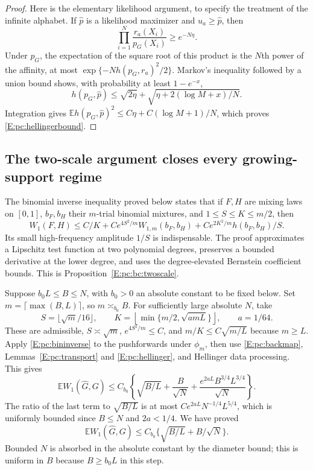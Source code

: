 \documentclass[11pt,a4paper]{article}
\theoremstyle{definition}
\theoremstyle{remark}
\numberwithin{equation}{section}
\begin{document}
\begin{proof}
Here is the elementary likelihood argument, to specify the treatment
of the infinite alphabet.  If $\widehat p$ is a likelihood maximizer
and $u_a\ge\widehat p$, then
\[
 \prod_{i=1}^N\frac{r_a(X_i)}{p_G(X_i)}\ge e^{-N\eta}.
\]
Under $p_G$, the expectation of the square root of this product is
the $N$th power of the affinity, at most
$\exp\{-Nh(p_G,r_a)^2/2\}$.  Markov's inequality followed by a
union bound shows, with probability at least $1-e^{-x}$,
\[
 h(p_G,\widehat p)\le\sqrt{2\eta}
       +\sqrt{\eta+2(\log M+x)/N}.
\]
Integration gives
$\mathbb E h(p_G,\widehat p)^2\le C\eta+C(\log M+1)/N$,
which proves \eqref{E:pc:hellingerbound}.
\end{proof}

\subsection{The two-scale argument closes every growing-support regime}

The binomial inverse inequality proved below states that if $F,H$ are
mixing laws on $[0,1]$, $b_F,b_H$ their $m$-trial binomial mixtures,
and $1\le S\le K\le m/2$, then
\begin{equation}\label{E:pc:bininverse}
 W_1(F,H)\le C/K+Ce^{4S^2/m}W_{1,m}(b_F,b_H)
                      +Ce^{2K^2/m}h(b_F,b_H)/S.
\end{equation}
Its small high-frequency amplitude $1/S$ is indispensable.
The proof approximates a Lipschitz test function at two polynomial
degrees, preserves a bounded derivative at the lower degree, and
uses the degree-elevated Bernstein coefficient bounds.  This is
Proposition~\ref{E:pc:bc:twoscale}.

Suppose $b_0L\le B\le N$, with $b_0>0$ an absolute constant to
be fixed below.  Set $m=\lceil\max(B,L)\rceil$, so $m\asymp_{b_0}B$.
For sufficiently large absolute $N$, take
\[
 S=\lfloor\sqrt m/16\rfloor,\qquad
 K=\left\lfloor\min\{m/2,\sqrt{a mL}\}\right\rfloor,
 \qquad a=1/64.
\]
These are admissible, $S\asymp\sqrt m$, $e^{4S^2/m}\le C$, and
$m/K\le C\sqrt{m/L}$ because $m\ge L$.
Apply \eqref{E:pc:bininverse} to the pushforwards under $\phi_m$,
then use \eqref{E:pc:backmap}, Lemmas~\ref{E:pc:transport} and
\ref{E:pc:hellinger}, and Hellinger data processing.  This gives
\[
 \mathbb E W_1(\widehat G,G)
 \le C_{b_0}\left\{
 \sqrt{B/L}+\frac B{\sqrt N}
       +\frac{e^{2aL}B^{3/4}L^{3/4}}{\sqrt N}\right\}.
\]
The ratio of the last term to $\sqrt{B/L}$ is at most
$C e^{2aL}N^{-1/4}L^{5/4}$, which is uniformly bounded since
$B\le N$ and $2a<1/4$.  We have proved
\begin{equation}\label{E:pc:medium}
 \mathbb E W_1(\widehat G,G)
                  \le C_{b_0}\{\sqrt{B/L}+B/\sqrt N\}.
\end{equation}
Bounded $N$ is absorbed in the absolute constant by the diameter
bound; this is uniform in $B$ because $B\ge b_0L$ in this step.
\end{document}
